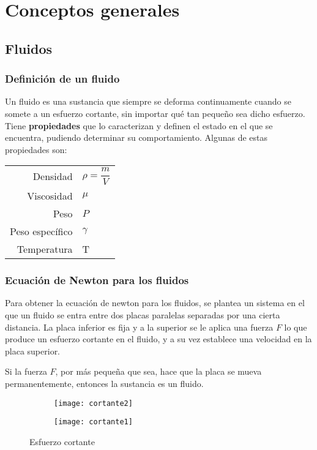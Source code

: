 \section{Conceptos generales}
\subsection{Fluidos}
\subsubsection{Definición de un fluido}
Un fluido es una sustancia que siempre se deforma continuamente cuando se somete a un esfuerzo cortante, sin importar qué tan pequeño sea dicho esfuerzo.\\

Tiene \textbf{propiedades} que lo caracterizan y definen el estado en el que se encuentra, pudiendo determinar su comportamiento. Algunas de estas propiedades son: \\
\begin{center}
	\begin{tabular} {r l}
		Densidad & $\rho = \dfrac{m}{V}$\\
		Viscosidad & $\mu$\\
		Peso & $P$\\
		Peso específico & $\gamma$ \\
		Temperatura & T \\
	\end{tabular}
\end{center}


\subsubsection{Ecuación de Newton para los fluidos}
Para obtener la ecuación de newton para los fluidos, se plantea un sistema en el que un fluido se entra entre dos placas paralelas separadas por una cierta distancia. La placa inferior es fija y a la superior se le aplica una fuerza $F$ lo que produce un esfuerzo cortante en el fluido, y a su vez establece una velocidad en la placa superior.

Si la fuerza $F$, por más pequeña que sea, hace que la placa se mueva permanentemente, entonces la sustancia es un fluido.

\begin{figure}[h]
	\centering
	\begin{subfigure}[b]{0.45\linewidth}
		\texttt{[image: cortante2]}
	\end{subfigure}
	\begin{subfigure}[b]{0.45\linewidth}
		\texttt{[image: cortante1]}
	\end{subfigure}
	\caption{Esfuerzo cortante}
\end{figure}

